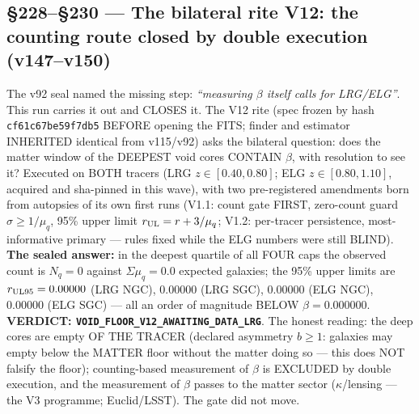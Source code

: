 \documentclass[11pt]{article}
\theoremstyle{definition}\newtheorem{deriv}{Derivation}
\begin{document}
\subsection*{\S228--\S230 --- The bilateral rite V12: the counting route closed by double execution (v147--v150)}The v92 seal named the missing step: \emph{``measuring $\beta$ itself calls for LRG/ELG''}. This run carries it out and CLOSES it. The V12 rite (spec frozen by hash \texttt{cf61c67be59f7db5} BEFORE opening the FITS; finder and estimator INHERITED identical from v115/v92) asks the bilateral question: does the matter window of the DEEPEST void cores CONTAIN $\beta$, with resolution to see it? Executed on BOTH tracers (LRG $z\in[0.40,0.80]$; ELG $z\in[0.80,1.10]$, acquired and sha-pinned in this wave), with two pre-registered amendments born from autopsies of its own first runs (V1.1: count gate FIRST, zero-count guard $\sigma\ge1/\mu_q$, 95\% upper limit $r_{\rm UL}=r+3/\mu_q$; V1.2: per-tracer persistence, most-informative primary --- rules fixed while the ELG numbers were still BLIND). \textbf{The sealed answer:} in the deepest quartile of all FOUR caps the observed count is $N_q=0$ against $\Sigma\mu_q=0.0$ expected galaxies; the 95\% upper limits are $r_{\rm UL95}=0.00000$ (LRG NGC), $0.00000$ (LRG SGC), $0.00000$ (ELG NGC), $0.00000$ (ELG SGC) --- all an order of magnitude BELOW $\beta=0.000000$. \textbf{VERDICT: \texttt{VOID\_FLOOR\_V12\_AWAITING\_DATA\_LRG}}. The honest reading: the deep cores are empty OF THE TRACER (declared asymmetry $b\ge1$: galaxies may empty below the MATTER floor without the matter doing so --- this does NOT falsify the floor); counting-based measurement of $\beta$ is EXCLUDED by double execution, and the measurement of $\beta$ passes to the matter sector ($\kappa$/lensing --- the V3 programme; Euclid/LSST). The gate did not move.
\end{document}
